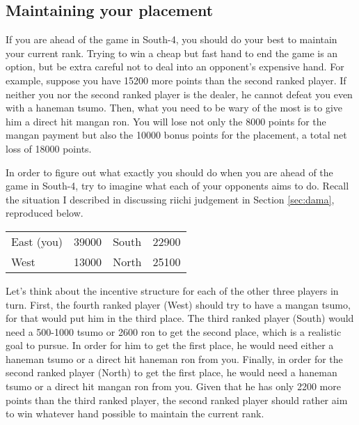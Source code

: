 \subsection*{Maintaining your placement}
If you are ahead of the game in South-4, you should do your best to maintain your current rank. Trying to win a cheap but fast hand to end the game is an option, but be extra careful not to deal into an opponent's expensive hand. For example, suppose you have 15200 more points than the second ranked player. If neither you nor the second ranked player is the dealer, he cannot defeat you even with a {\jap haneman tsumo}. Then, what you need to be wary of the most is to give him a direct hit {\jap mangan ron}. You will lose not only the 8000 points for the {\jap mangan} payment but also the 10000 bonus points for the placement, a total net loss of 18000 points.

\bigskip
In order to figure out what exactly you should do when you are ahead of the game in South-4, try to imagine what each of your opponents aims to do. Recall the situation I described in discussing riichi judgement in Section \ref{sec:dama}, reproduced below.

\begin{table}[h]
\begin{center}
\begin{tabular}{l r l r}
East (you) & 39000 & South & 22900\\
West & 13000 & North & 25100\\
\end{tabular}
\end{center}
\vspace{-10pt}
\end{table}

\bigskip
Let's think about the incentive structure for each of the other three players in turn. First, the fourth ranked player (West) should try to have a {\jap mangan tsumo}, for that would put him in the third place. The third ranked player (South) would need a 500-1000 {\jap tsumo} or 2600 {\jap ron} to get the second place, which is a realistic goal to pursue. In order for him to get the first place, he would need either a {\jap haneman tsumo} or a direct hit {\jap haneman ron} from you. Finally, in order for the second ranked player (North) to get the first place, he would need a {\jap haneman tsumo} or a direct hit {\jap mangan ron} from you. Given that he has only 2200 more points than the third ranked player, the second ranked player should rather aim to win whatever hand possible to maintain the current rank. 

